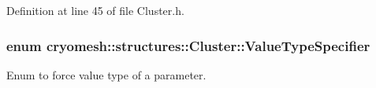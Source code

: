 \-Definition at line 45 of file \-Cluster.\-h.

\hypertarget{classcryomesh_1_1structures_1_1Cluster_af2978a9bf2737e5e701600af095ea88f}{
\subsubsection[{\-Value\-Type\-Specifier}]{\setlength{\rightskip}{0pt plus 5cm}enum {\bf cryomesh\-::structures\-::\-Cluster\-::\-Value\-Type\-Specifier}}}\label{classcryomesh_1_1structures_1_1Cluster_af2978a9bf2737e5e701600af095ea88f}


\-Enum to force value type of a parameter. 


